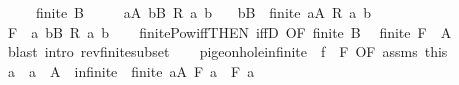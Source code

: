 \begin{isabellebody}
\ \ \ \ \ {\isachardoublequoteopen}finite\ B{\isachardoublequoteclose}\isanewline
\ \ \ \ \ {\isachardoublequoteopen}{\isasymforall}a{\isasymin}A{\isachardot}{\kern0pt}\ {\isasymexists}b{\isasymin}B{\isachardot}{\kern0pt}\ R\ a\ b{\isachardoublequoteclose}\isanewline
\ \ \ {\isachardoublequoteopen}{\isasymexists}b{\isasymin}B{\isachardot}{\kern0pt}\ {\isasymnot}\ finite\ {\isacharbraceleft}{\kern0pt}a{\isacharcolon}{\kern0pt}A{\isachardot}{\kern0pt}\ R\ a\ b{\isacharbraceright}{\kern0pt}{\isachardoublequoteclose}\isanewline
%
\isadelimproof
%
\endisadelimproof
%
\isatagproof
{}\isamarkupfalse%
\ {\isacharminus}{\kern0pt}\isanewline
\ \ \isamarkupfalse%
\ {\isacharquery}{\kern0pt}F\ {\isacharequal}{\kern0pt}\ {\isachardoublequoteopen}{\isasymlambda}a{\isachardot}{\kern0pt}\ {\isacharbraceleft}{\kern0pt}b{\isasymin}B{\isachardot}{\kern0pt}\ R\ a\ b{\isacharbraceright}{\kern0pt}{\isachardoublequoteclose}\isanewline
\ \ \isamarkupfalse%
\ finite{\isacharunderscore}{\kern0pt}Pow{\isacharunderscore}{\kern0pt}iff{\isacharbrackleft}{\kern0pt}THEN\ iffD{}{\isacharcomma}{\kern0pt}\ OF\ {\isacartoucheopen}finite\ B{\isacartoucheclose}{\isacharbrackright}{\kern0pt}\ \isamarkupfalse%
\ {\isachardoublequoteopen}finite\ {\isacharparenleft}{\kern0pt}{\isacharquery}{\kern0pt}F\ {\isacharbackquote}{\kern0pt}\ A{\isacharparenright}{\kern0pt}{\isachardoublequoteclose}\isanewline
\ \ \ \ \isamarkupfalse%
\ {\isacharparenleft}{\kern0pt}blast\ intro{\isacharcolon}{\kern0pt}\ rev{\isacharunderscore}{\kern0pt}finite{\isacharunderscore}{\kern0pt}subset{\isacharparenright}{\kern0pt}\isanewline
\ \ \isamarkupfalse%
\ pigeonhole{\isacharunderscore}{\kern0pt}infinite\ {\isacharbrackleft}{\kern0pt}\ f\ {\isacharequal}{\kern0pt}\ {\isacharquery}{\kern0pt}F{\isacharcomma}{\kern0pt}\ OF\ assms{\isacharparenleft}{\kern0pt}{}{\isacharparenright}{\kern0pt}\ this{\isacharbrackright}{\kern0pt}\isanewline
\ \ \isamarkupfalse%
\ a{}\ \ {\isachardoublequoteopen}a{}\ {\isasymin}\ A{\isachardoublequoteclose}\ \ infinite{\isacharcolon}{\kern0pt}\ {\isachardoublequoteopen}{\isasymnot}\ finite\ {\isacharbraceleft}{\kern0pt}a{\isasymin}A{\isachardot}{\kern0pt}\ {\isacharquery}{\kern0pt}F\ a\ {\isacharequal}{\kern0pt}\ {\isacharquery}{\kern0pt}F\ a{}{\isacharbraceright}{\kern0pt}{\isachardoublequoteclose}\ \isacommand{{\isachardot}{\kern0pt}{\isachardot}{\kern0pt}}\isamarkupfalse%

\end{isabellebody}
